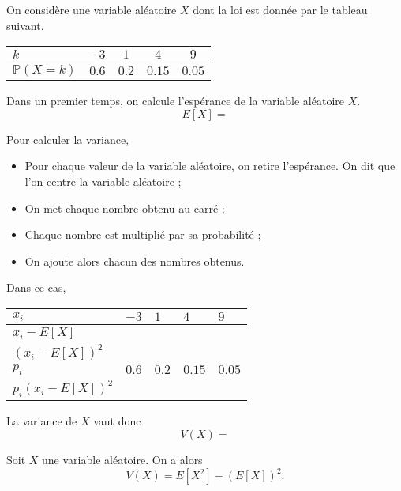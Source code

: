 \documentclass[11pt,fleqn, openany]{book} %
\begin{document}
\begin{example}On considère une variable aléatoire $X$ dont la loi est donnée par le tableau suivant.

\renewcommand{\arraystretch}{2.2}
\begin{center}
\begin{tabular}{|l|c|c|c|c|}
\hline
$k$ & $-3$& $1$ & $4$ & $9$ \\
\hline
$\mathbb{P}(X=k)$ & $0.6$ & $0.2$ & $0.15$ & $0.05$\\
\hline \end{tabular}
\end{center}

Dans un premier temps, on calcule l'espérance de la variable aléatoire $X$.
\[E[X] =\]

Pour calculer la variance,
\begin{itemize}
\item Pour chaque valeur de la variable aléatoire, on retire l'espérance. On dit que l'on centre la variable aléatoire ;
\item On met chaque nombre obtenu au carré ;
\item Chaque nombre est multiplié par sa probabilité ;
\item On ajoute alors chacun des nombres obtenus.
\end{itemize}
\newpage
Dans ce cas,
\renewcommand{\arraystretch}{2.2}
\begin{center}
\begin{tabularx}{0.9 \linewidth}{|l|X|X|X|X|}
\hline
$x_i$ & $-3$& $1$ & $4$ & $9$ \\
\hline
$x_i-E[X]$ & &  &  &  \\
\hline
$(x_i-E[X])^2$ & &  &  & \\
\hline
$p_i$ & $0.6$ & $0.2$ & $0.15$ & $0.05$\\
\hline
$p_i(x_i-E[X])^2$ &  &  &  & \\
\hline \end{tabularx}
\end{center}

La variance de $X$ vaut donc 
\[ V(X) =\]\end{example}

\begin{proposition}
Soit $X$ une variable aléatoire. On a alors
\[V(X)=E[X^2]-(E[X])^2.\]
\end{proposition}
\end{document}
